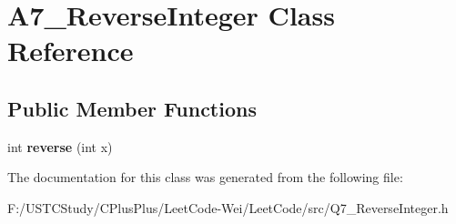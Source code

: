 \hypertarget{class_a7___reverse_integer}{}\section{A7\+\_\+\+Reverse\+Integer Class Reference}
\label{class_a7___reverse_integer}
\subsection*{Public Member Functions}
\begin{DoxyCompactItemize}
\item 
\hypertarget{class_a7___reverse_integer_a7b5d6f00e1ca3aecc2a44976e325e85a}{}\label{class_a7___reverse_integer_a7b5d6f00e1ca3aecc2a44976e325e85a} 
int {\bfseries reverse} (int x)
\end{DoxyCompactItemize}


The documentation for this class was generated from the following file\+:\begin{DoxyCompactItemize}
\item 
F\+:/\+U\+S\+T\+C\+Study/\+C\+Plus\+Plus/\+Leet\+Code-\/\+Wei/\+Leet\+Code/src/Q7\+\_\+\+Reverse\+Integer.\+h\end{DoxyCompactItemize}
